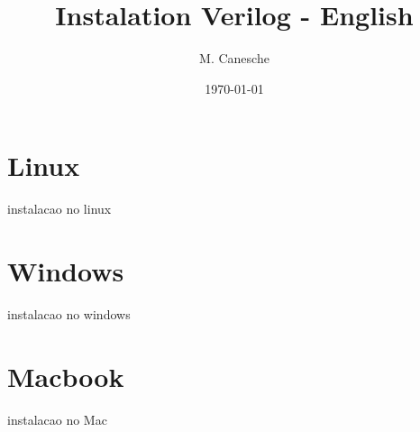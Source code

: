 \documentclass{article}
\title{Instalation Verilog - English}
\date{\today}
\author{M. Canesche}
\begin{document}
		\maketitle
	
		\section{Linux}
			
			instalacao no linux	
			
		\section{Windows}
		
			instalacao no windows
			
		\section{Macbook}
		
			instalacao no Mac
	
	
\end{document}
